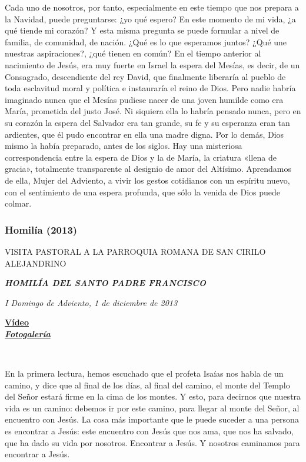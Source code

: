 Cada uno de nosotros, por tanto, especialmente en este tiempo que nos
prepara a la Navidad, puede preguntarse: ¿yo qué espero? En este momento
de mi vida, ¿a qué tiende mi corazón? Y esta misma pregunta se puede
formular a nivel de familia, de comunidad, de nación. ¿Qué es lo que
esperamos juntos? ¿Qué une nuestras aspiraciones?, ¿qué tienen en común?
En el tiempo anterior al nacimiento de Jesús, era muy fuerte en Israel
la espera del Mesías, es decir, de un Consagrado, descendiente del rey
David, que finalmente liberaría al pueblo de toda esclavitud moral y
política e instauraría el reino de Dios. Pero nadie habría imaginado
nunca que el Mesías pudiese nacer de una joven humilde como era María,
prometida del justo José. Ni siquiera ella lo habría pensado nunca, pero
en su corazón la espera del Salvador era tan grande, su fe y su
esperanza eran tan ardientes, que él pudo encontrar en ella una madre
digna. Por lo demás, Dios mismo la había preparado, antes de los siglos.
Hay una misteriosa correspondencia entre la espera de Dios y la de
María, la criatura «llena de gracia», totalmente transparente al
designio de amor del Altísimo. Aprendamos de ella, Mujer del Adviento, a
vivir los gestos cotidianos con un espíritu nuevo, con el sentimiento de
una espera profunda, que sólo la venida de Dios puede colmar.

\subsubsection{Homilía (2013)}
VISITA PASTORAL A LA PARROQUIA ROMANA DE SAN CIRILO ALEJANDRINO

\textbf{\emph{HOMILÍA DEL SANTO PADRE FRANCISCO}}

\emph{I Domingo de Adviento, 1 de diciembre de 2013}

\textbf{\href{http://player.rv.va/vaticanplayer.asp?language=it\&tic=VA_6LU4U5WW}{Vídeo}\\
	\emph{\href{http://www.photogallery.va/content/photogallery/es/celebrazioni-liturgiche/cirillo-alessandrino-20131201.html}{Fotogalería}}}

~

En la primera lectura, hemos escuchado que el profeta Isaías nos habla
de un camino, y dice que al final de los días, al final del camino, el
monte del Templo del Señor estará firme en la cima de los montes. Y
esto, para decirnos que nuestra vida es un camino: debemos ir por este
camino, para llegar al monte del Señor, al encuentro con Jesús. La cosa
más importante que le puede suceder a una persona es encontrar a Jesús:
este encuentro con Jesús que nos ama, que nos ha salvado, que ha dado su
vida por nosotros. Encontrar a Jesús. Y nosotros caminamos para
encontrar a Jesús.

